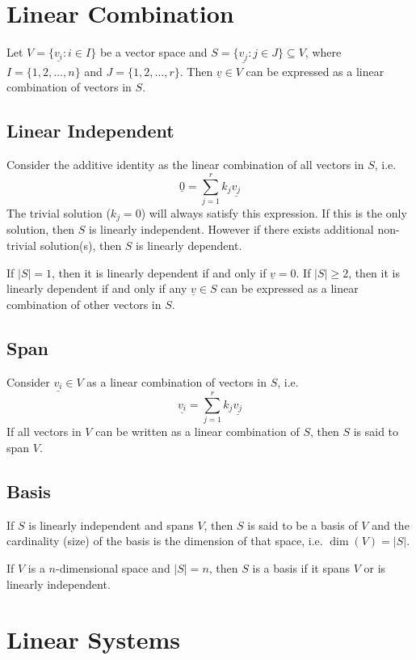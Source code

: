 \documentclass{article}
\begin{document}
\newpage

\section{Linear Combination}

Let $V = \{\underline{v_i}: i \in I\}$ be a vector space and $S = \{\underline{v_j}: j \in J\} \subseteq V$, where $I = \{1,2,\dots,n\}$ and $J = \{1,2,\dots,r\}$. Then $\underline{v} \in V$ can be expressed as a linear combination of vectors in $S$.

\subsection{Linear Independent}

Consider the additive identity as the linear combination of all vectors in $S$, i.e.
$$\underline{0} = \sum_{j=1}^{r}k_j\underline{v_j}$$
The trivial solution ($k_j = 0$) will always satisfy this expression. If this is the only solution, then $S$ is linearly independent. However if there exists additional non-trivial solution(s), then $S$ is linearly dependent.

If $|S| = 1$, then it is linearly dependent if and only if $\underline{v} = 0$. If $|S| \geq 2$, then it is linearly dependent if and only if any $\underline{v} \in S$ can be expressed as a linear combination of other vectors in $S$.

\subsection{Span}

Consider $\underline{v_i }\in V$ as a linear combination of vectors in $S$, i.e.
$$\underline{v_i} = \sum_{j =1}^{r}k_j\underline{v_j}$$
If all vectors in $V$ can be written as a linear combination of $S$, then $S$ is said to span $V$.

\subsection{Basis}

If $S$ is linearly independent and spans $V$, then $S$ is said to be a basis of $V$ and the cardinality (size) of the basis is the dimension of that space, i.e. $\dim(V) = |S|$.

If $V$ is a $n$-dimensional space and $|S| = n$, then $S$ is a basis if it spans $V$ or is linearly independent.

\section{Linear Systems}
\end{document}
